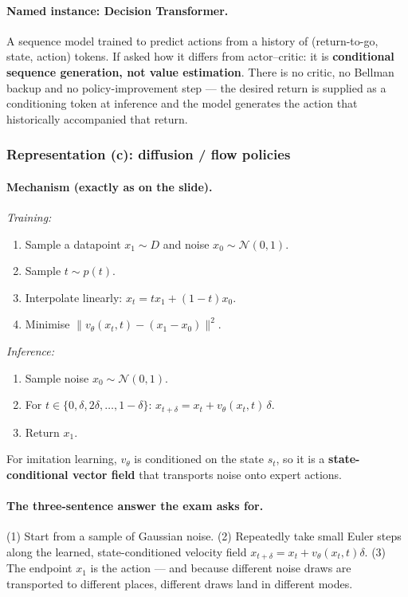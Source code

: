 \documentclass[11pt,a4paper]{article}
\begin{document}
\paragraph{Named instance: Decision Transformer.} A sequence model trained to
predict actions from a history of (return-to-go, state, action) tokens.
If asked how it differs from actor--critic: it is \textbf{conditional
sequence generation, not value estimation}. There is no critic, no Bellman
backup and no policy-improvement step --- the desired return is supplied as a
conditioning token at inference and the model generates the action that
historically accompanied that return.

\subsubsection{Representation (c): diffusion / flow policies}

\paragraph{Mechanism (exactly as on the slide).}
\emph{Training:}
\begin{enumerate}[label=\arabic*.]
\item Sample a datapoint $x_1\sim D$ and noise $x_0\sim\mathcal N(0,1)$.
\item Sample $t\sim p(t)$.
\item Interpolate linearly: $x_t = t x_1 + (1-t)x_0$.
\item Minimise $\|v_\theta(x_t,t)-(x_1-x_0)\|^2$.
\end{enumerate}
\emph{Inference:}
\begin{enumerate}[label=\arabic*.]
\item Sample noise $x_0\sim\mathcal N(0,1)$.
\item For $t\in\{0,\delta,2\delta,\dots,1-\delta\}$: $x_{t+\delta}=x_t+v_\theta(x_t,t)\,\delta$.
\item Return $x_1$.
\end{enumerate}
For imitation learning, $v_\theta$ is conditioned on the state $s_t$, so it is
a \textbf{state-conditional vector field} that transports noise onto expert
actions.

\paragraph{The three-sentence answer the exam asks for.}
(1) Start from a sample of Gaussian noise. (2) Repeatedly take small Euler
steps along the learned, state-conditioned velocity field
$x_{t+\delta}=x_t+v_\theta(x_t,t)\delta$. (3) The endpoint $x_1$ is the
action --- and because different noise draws are transported to different
places, different draws land in different modes.
\end{document}
